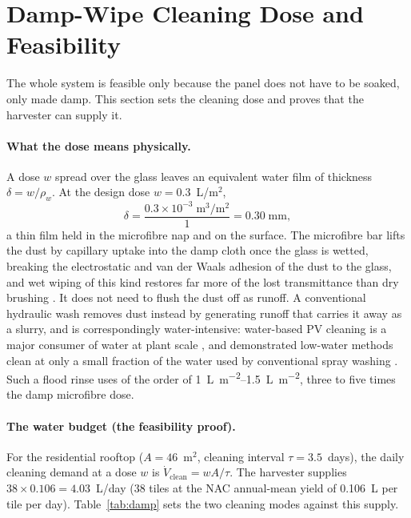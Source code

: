 \documentclass[12pt,a4paper]{report}   %
\begin{document}
\section{Damp-Wipe Cleaning Dose and Feasibility}
\label{sec:damp}

The whole system is feasible only because the panel does not have to be soaked, only made damp.
This section sets the cleaning dose and proves that the harvester can supply it.

\paragraph{What the dose means physically.} A dose $w$ spread over the glass leaves an equivalent
water film of thickness $\delta = w/\rho_w$. At the design dose $w = 0.3$~L/m$^2$,
\begin{equation}
  \delta = \frac{0.3\times10^{-3}\;\text{m}^3/\text{m}^2}{1}
         = 0.30\;\text{mm},
  \label{eq:film}
\end{equation}
a thin film held in the microfibre nap and on the surface. The microfibre bar lifts the dust by
capillary uptake into the damp cloth once the glass is wetted, breaking the electrostatic and van
der Waals adhesion of the dust to the glass, and wet wiping of this kind restores far more of the
lost transmittance than dry brushing \cite{mejia2021cleaning}. It does not need to flush the dust
off as runoff. A conventional hydraulic wash removes dust instead by generating runoff that carries
it away as a slurry, and is correspondingly water-intensive: water-based PV cleaning is a major
consumer of water at plant scale \cite{panat2022electrostatic}, and demonstrated low-water methods
clean at only a small fraction of the water used by conventional spray washing \cite{dong2022droplet}.
Such a flood rinse uses of the order of \SIrange{1}{1.5}{\liter\per\metre\squared}, three to five
times the damp microfibre dose.

\paragraph{The water budget (the feasibility proof).} For the residential rooftop
($A = 46$~m$^2$, cleaning interval $\tau = 3.5$~days), the daily cleaning demand at a dose $w$ is
$\dot V_{\mathrm{clean}} = wA/\tau$. The harvester supplies $38 \times 0.106 = 4.03$~L/day
(38 tiles at the NAC annual-mean yield of \SI{0.106}{\liter} per tile per day). Table~\ref{tab:damp}
sets the two cleaning modes against this supply.
\end{document}
